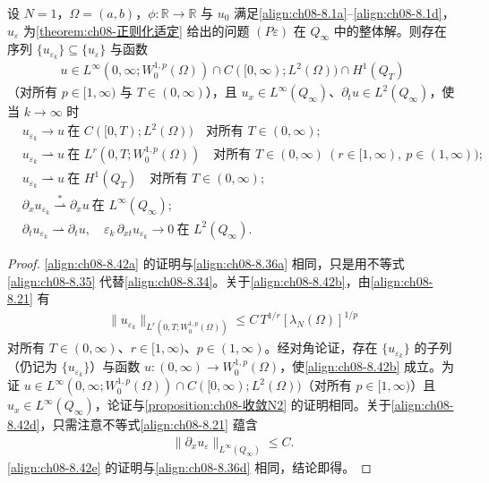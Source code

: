 \documentclass[../../main.tex]{subfiles}%
\begin{document}
\begin{proposition}[$N=1$ 情形的解的收敛]\label{proposition:ch08-收敛N1}
设 $N=1$，$\Omega=(a,b)$，$\phi:\mathbb{R}\to\mathbb{R}$ 与 $u_0$ 满足\eqref{align:ch08-8.1a}--\eqref{align:ch08-8.1d}，$u_\varepsilon$ 为\cref{theorem:ch08-正则化适定} 给出的问题 $(P\varepsilon)$ 在 $Q_\infty$ 中的整体解。则存在序列 $\{u_{\varepsilon_k}\}\subseteq\{u_\varepsilon\}$ 与函数
\begin{align*}
u\in L^\infty(0,\infty;W^{1,p}_0(\Omega))\cap C([0,\infty);L^2(\Omega))\cap H^1(Q_T)
\end{align*}
（对所有 $p\in[1,\infty)$ 与 $T\in(0,\infty)$），且 $u_x\in L^\infty(Q_\infty)$、$\partial_tu\in L^2(Q_\infty)$，使当 $k\to\infty$ 时
\begin{align}
&u_{\varepsilon_k}\to u\ \text{在 }C([0,T);L^2(\Omega))\quad\text{对所有 }T\in(0,\infty); \label{align:ch08-8.42a}\\
&u_{\varepsilon_k}\rightharpoonup u\ \text{在 }L^r(0,T;W^{1,p}_0(\Omega))\quad\text{对所有 }T\in(0,\infty)\ (r\in[1,\infty),\ p\in(1,\infty)); \label{align:ch08-8.42b}\\
&u_{\varepsilon_k}\rightharpoonup u\ \text{在 }H^1(Q_T)\quad\text{对所有 }T\in(0,\infty); \label{align:ch08-8.42c}\\
&\partial_x u_{\varepsilon_k}\stackrel{*}{\rightharpoonup}\partial_x u\ \text{在 }L^\infty(Q_\infty); \label{align:ch08-8.42d}\\
&\partial_t u_{\varepsilon_k}\rightharpoonup\partial_t u,\quad
\varepsilon_k\,\partial_{xt}u_{\varepsilon_k}\to0\ \text{在 }L^2(Q_\infty). \label{align:ch08-8.42e}
\end{align}
\end{proposition}

\begin{proof}
\eqref{align:ch08-8.42a} 的证明与\eqref{align:ch08-8.36a} 相同，只是用不等式\eqref{align:ch08-8.35} 代替\eqref{align:ch08-8.34}。关于\eqref{align:ch08-8.42b}，由\eqref{align:ch08-8.21} 有
\begin{align}
\|u_{\varepsilon_k}\|_{L^r(0,T;W^{1,p}_0(\Omega))}\leqslant C\,T^{1/r}[\lambda_N(\Omega)]^{1/p} \label{align:ch08-8.43}
\end{align}
对所有 $T\in(0,\infty)$、$r\in[1,\infty)$、$p\in(1,\infty)$。经对角论证，存在 $\{u_{\varepsilon_k}\}$ 的子列（仍记为 $\{u_{\varepsilon_k}\}$）与函数 $u:(0,\infty)\to W^{1,p}_0(\Omega)$，使\eqref{align:ch08-8.42b} 成立。为证 $u\in L^\infty(0,\infty;W^{1,p}_0(\Omega))\cap C([0,\infty);L^2(\Omega))$（对所有 $p\in[1,\infty)$）且 $u_x\in L^\infty(Q_\infty)$，论证与\cref{proposition:ch08-收敛N2} 的证明相同。关于\eqref{align:ch08-8.42d}，只需注意不等式\eqref{align:ch08-8.21} 蕴含
\begin{align}
\|\partial_x u_\varepsilon\|_{L^\infty(Q_\infty)}\leqslant C. \label{align:ch08-8.44}
\end{align}
\eqref{align:ch08-8.42e} 的证明与\eqref{align:ch08-8.36d} 相同，结论即得。
\end{proof}
\end{document}
